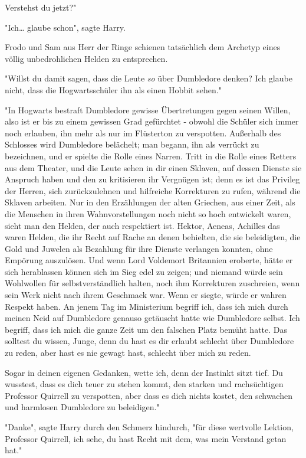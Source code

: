 {Verstehst du jetzt?"

"Ich… glaube schon", sagte Harry.

Frodo und Sam aus Herr der Ringe schienen tatsächlich dem Archetyp eines völlig unbedrohlichen Helden zu entsprechen.

"Willst du damit sagen, dass die Leute \emph{so} über Dumbledore denken? Ich glaube nicht, dass die Hogwartsschüler ihn als einen Hobbit sehen."

"In Hogwarts bestraft Dumbledore gewisse Übertretungen gegen seinen Willen, also ist er bis zu einem gewissen Grad gefürchtet - obwohl die Schüler sich immer noch erlauben, ihn mehr als nur im Flüsterton zu verspotten. Außerhalb des Schlosses wird Dumbledore belächelt; man begann, ihn als verrückt zu bezeichnen, und er spielte die Rolle eines Narren. Tritt in die Rolle eines Retters aus dem Theater, und die Leute sehen in dir einen Sklaven, auf dessen Dienste sie Anspruch haben und den zu kritisieren ihr Vergnügen ist; denn es ist das Privileg der Herren, sich zurückzulehnen und hilfreiche Korrekturen zu rufen, während die Sklaven arbeiten. Nur in den Erzählungen der alten Griechen, aus einer Zeit, als die Menschen in ihren Wahnvorstellungen noch nicht so hoch entwickelt waren, sieht man den Helden, der auch respektiert ist. Hektor, Aeneas, Achilles das waren Helden, die ihr Recht auf Rache an denen behielten, die sie beleidigten, die Gold und Juwelen als Bezahlung für ihre Dienste verlangen konnten, ohne Empörung auszulösen. Und wenn Lord Voldemort Britannien eroberte, hätte er sich herablassen können sich im Sieg edel zu zeigen; und niemand würde sein Wohlwollen für selbstverständlich halten, noch ihm Korrekturen zuschreien, wenn sein Werk nicht nach ihrem Geschmack war. Wenn er siegte, würde er wahren Respekt haben. An jenem Tag im Ministerium begriff ich, dass ich mich durch meinen Neid auf Dumbledore genauso getäuscht hatte wie Dumbledore selbst. Ich begriff, dass ich mich die ganze Zeit um den falschen Platz bemüht hatte. Das solltest du wissen, Junge, denn du hast es dir erlaubt schlecht über Dumbledore zu reden, aber hast es nie gewagt hast, schlecht über mich zu reden.

Sogar in deinen eigenen Gedanken, wette ich, denn der Instinkt sitzt tief. Du wusstest, dass es dich teuer zu stehen kommt, den starken und rachsüchtigen Professor Quirrell zu verspotten, aber dass es dich nichts kostet, den schwachen und harmlosen Dumbledore zu beleidigen."

"Danke", sagte Harry durch den Schmerz hindurch, "für diese wertvolle Lektion, Professor Quirrell, ich sehe, du hast Recht mit dem, was mein Verstand getan hat."

}
